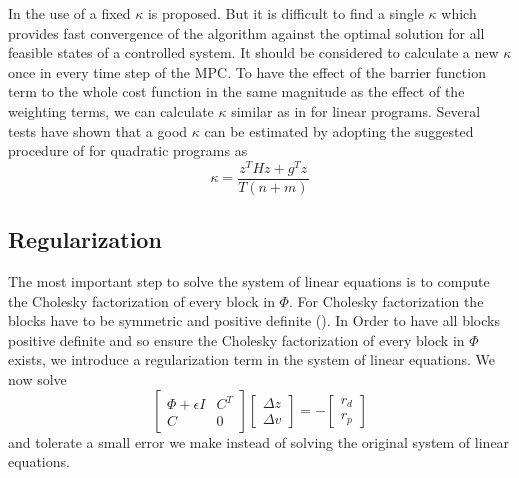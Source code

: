 \documentclass[letterpaper, 10 pt, conference]{ieeeconf}  %
\begin{document}
In \cite{c1} the use of a fixed $\kappa$ is proposed. But it is difficult to find a single $\kappa$ which provides fast convergence of the algorithm against the optimal solution for all feasible states of a controlled system. It should be considered to calculate a new $\kappa$ once in every time step of the MPC. To have the effect of the barrier function term to the whole cost function in the same magnitude as the effect of the weighting terms, we can calculate $\kappa$ similar as in \cite{c4} for linear programs. Several tests have shown that a good $\kappa$ can be estimated by adopting the suggested procedure of \cite{c4} for quadratic programs as 
\begin{equation*}
  \kappa=\frac{z^{T}Hz + g^{T}z}{T(n+m)}
\end{equation*}

\addtolength{\textheight}{-6cm}   %
\subsection{Regularization}

The most important step to solve the system of linear equations is to compute the Cholesky factorization of every block in $\Phi$. For Cholesky factorization the blocks have to be symmetric and positive definite (\cite{c2}). In Order to have all blocks positive definite and so ensure the Cholesky factorization of every block in $\Phi$ exists, we introduce a regularization term in the system of linear equations. We now solve
\begin{equation}
  \begin{bmatrix} \Phi+\epsilon I & C^{T} \\ C & 0 \end{bmatrix} \begin{bmatrix}\Delta z \\ \Delta v\end{bmatrix}= -\begin{bmatrix}r_d \\ r_p\end{bmatrix}
\end{equation}
and tolerate a small error we make instead of solving the original system of linear equations.
\end{document}
